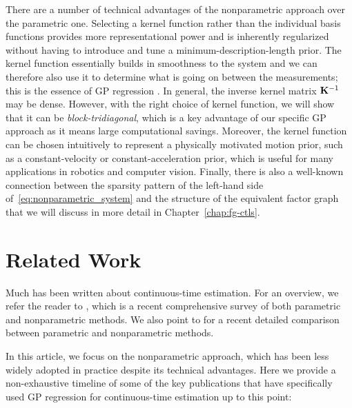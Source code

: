 There are a number of technical advantages of the nonparametric approach over the parametric one.  Selecting a kernel function rather than the individual basis functions provides more representational power and is inherently regularized without having to introduce and tune a minimum-description-length prior.  The kernel function essentially builds in smoothness to the system and we can therefore also use it to determine what is going on between the measurements; this is the essence of \ac{GP} regression \citep{rasmussen06}.  In general, the inverse kernel matrix $\mathbf{K}^{-1}$ may be dense.  However, with the right choice of kernel function, we will show that it can be {\em block-tridiagonal}, which is a key advantage of our specific \ac{GP} approach as it means large computational savings.  Moreover, the kernel function can be chosen intuitively to represent a physically motivated motion prior, such as a constant-velocity or constant-acceleration prior, which is useful for many applications in robotics and computer vision.  Finally, there is also a well-known connection between the sparsity pattern of the left-hand side of~\eqref{eq:nonparametric_system} and the structure of the equivalent factor graph that we will discuss in more detail in Chapter~\ref{chap:fg-ctls}.  

\section{Related Work}

Much has been written about continuous-time estimation.  For an overview, we refer the reader to \citet{talbot_tro25}, which is a recent comprehensive survey of both parametric and nonparametric methods.  We also point to \citet{johnson_arxiv24} for a recent detailed comparison between parametric and nonparametric methods.  

In this article, we focus on the nonparametric approach, which has been less widely adopted in practice despite its technical advantages.  Here we provide a non-exhaustive timeline of some of the key publications that have specifically used \ac{GP} regression for continuous-time estimation up to this point:

